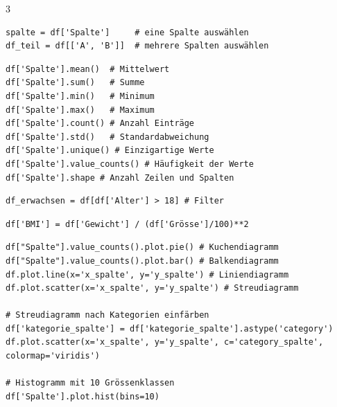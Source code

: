 \begin{landscape}
\begin{multicols*}{3}
		\begin{cheatSheetBox}[title=Spalten auswählen]
			\begin{lstlisting}
spalte = df['Spalte']     # eine Spalte auswählen
df_teil = df[['A', 'B']]  # mehrere Spalten auswählen
\end{lstlisting}
		\end{cheatSheetBox}

		\begin{cheatSheetBox}[title=Tabellen-Statistiken]
			\begin{lstlisting}
df['Spalte'].mean()  # Mittelwert
df['Spalte'].sum()   # Summe
df['Spalte'].min()   # Minimum
df['Spalte'].max()   # Maximum
df['Spalte'].count() # Anzahl Einträge
df['Spalte'].std()   # Standardabweichung
df['Spalte'].unique() # Einzigartige Werte
df['Spalte'].value_counts() # Häufigkeit der Werte
df['Spalte'].shape # Anzahl Zeilen und Spalten
\end{lstlisting}

		\end{cheatSheetBox}

		\begin{cheatSheetBox}[title=Zeilen filtern]
			\begin{lstlisting}
df_erwachsen = df[df['Alter'] > 18] # Filter 
\end{lstlisting}
		\end{cheatSheetBox}

		\begin{cheatSheetBox}[title=Neue Spalte erstellen]
			\begin{lstlisting}
df['BMI'] = df['Gewicht'] / (df['Grösse']/100)**2
\end{lstlisting}
		\end{cheatSheetBox}

		\begin{cheatSheetBox}[title=Grafiken erstellen]
			\begin{lstlisting}
df["Spalte"].value_counts().plot.pie() # Kuchendiagramm
df["Spalte"].value_counts().plot.bar() # Balkendiagramm
df.plot.line(x='x_spalte', y='y_spalte') # Liniendiagramm
df.plot.scatter(x='x_spalte', y='y_spalte') # Streudiagramm

# Streudiagramm nach Kategorien einfärben
df['kategorie_spalte'] = df['kategorie_spalte'].astype('category') 
df.plot.scatter(x='x_spalte', y='y_spalte', c='category_spalte', colormap='viridis')

# Histogramm mit 10 Grössenklassen
df['Spalte'].plot.hist(bins=10)


\end{lstlisting}
\end{cheatSheetBox}
\end{multicols*}
\end{landscape}

